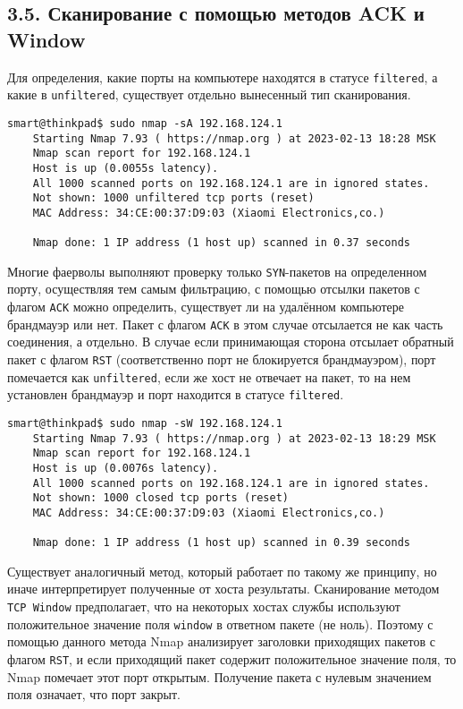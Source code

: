 \subsection*{3.5. Сканирование с помощью методов ACK и Window}

Для определения, какие порты на компьютере находятся в статусе \texttt{filtered}, а какие в \texttt{unfiltered}, существует отдельно вынесенный тип сканирования.

\begin{Verbatim}[frame=single,breaklines=true,breakanywhere=true]
    smart@thinkpad$ sudo nmap -sA 192.168.124.1
    Starting Nmap 7.93 ( https://nmap.org ) at 2023-02-13 18:28 MSK
    Nmap scan report for 192.168.124.1
    Host is up (0.0055s latency).
    All 1000 scanned ports on 192.168.124.1 are in ignored states.
    Not shown: 1000 unfiltered tcp ports (reset)
    MAC Address: 34:CE:00:37:D9:03 (Xiaomi Electronics,co.)
    
    Nmap done: 1 IP address (1 host up) scanned in 0.37 seconds
\end{Verbatim}

Многие фаерволы выполняют проверку только \texttt{SYN}-пакетов на определенном порту, осуществляя тем самым фильтрацию, с помощью отсылки пакетов с флагом \texttt{ACK} можно определить, существует ли на удалённом компьютере брандмауэр или нет. Пакет с флагом \texttt{ACK} в этом случае отсылается не как часть соединения, а отдельно. В случае если принимающая сторона отсылает обратный пакет с флагом \texttt{RST} (соответственно порт не блокируется брандмауэром), порт помечается как \texttt{unfiltered}, если же хост не отвечает на пакет, то на нем установлен брандмауэр и порт находится в статусе \texttt{filtered}.

\begin{Verbatim}[frame=single,breaklines=true,breakanywhere=true]
    smart@thinkpad$ sudo nmap -sW 192.168.124.1
    Starting Nmap 7.93 ( https://nmap.org ) at 2023-02-13 18:29 MSK
    Nmap scan report for 192.168.124.1
    Host is up (0.0076s latency).
    All 1000 scanned ports on 192.168.124.1 are in ignored states.
    Not shown: 1000 closed tcp ports (reset)
    MAC Address: 34:CE:00:37:D9:03 (Xiaomi Electronics,co.)

    Nmap done: 1 IP address (1 host up) scanned in 0.39 seconds
\end{Verbatim}

Существует аналогичный метод, который работает по такому же принципу, но иначе интерпретирует полученные от хоста результаты. Сканирование методом \texttt{TCP Window} предполагает, что на некоторых хостах службы используют положительное значение поля \texttt{window} в ответном пакете (не ноль). Поэтому с помощью данного метода Nmap анализирует заголовки приходящих пакетов с флагом \texttt{RST}, и если приходящий пакет содержит положительное значение поля, то Nmap помечает этот порт открытым. Получение пакета с нулевым значением поля означает, что порт закрыт.

